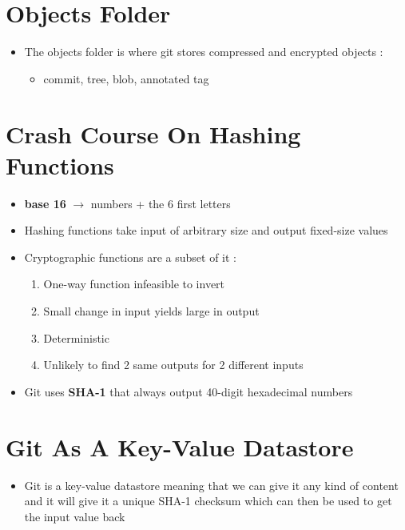 \documentclass{report}
\begin{document}
\section{Objects Folder}

\begin{itemize}
	\item The objects folder is where git stores compressed and encrypted objects :
		\begin{itemize}
			\item commit, tree, blob, annotated tag
		\end{itemize}
\end{itemize}

\section{Crash Course On Hashing Functions}

\begin{itemize}
	\item \textbf{base 16} $\rightarrow$ numbers + the 6 first letters 
	\item Hashing functions take input of arbitrary size and output fixed-size values 
	\item Cryptographic functions are a subset of it :
		\begin{enumerate}
			\item One-way function infeasible to invert 
			\item Small change in input yields large in output 
			\item Deterministic 
			\item Unlikely to find 2 same outputs for 2 different inputs
		\end{enumerate}
	\item Git uses \textbf{SHA-1} that always output 40-digit hexadecimal numbers
\end{itemize}

\section{Git As A Key-Value Datastore}

\begin{itemize}
	\item Git is a key-value datastore meaning that we can give it any kind of content and it will give it a unique SHA-1 checksum which can then be used to get the input value back
\end{itemize}
\end{document}
